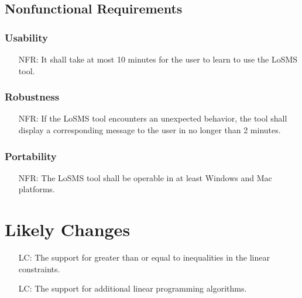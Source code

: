 \documentclass[12pt]{article}
\newcounter{reqnum} %
\newcounter{nfreqnum} %
\newcounter{lcnum} %
\newcommand{\famname}{LoSMS} %
\begin{document}
\subsection{Nonfunctional Requirements}

\subsubsection*{Usability}

\noindent 
\begin{itemize}
	\item[NFR\refstepcounter{nfreqnum}\thenfreqnum \label{usability}:] It shall 
	take at most 10 minutes for the user to learn to use the \famname{} tool.
\end{itemize}

\subsubsection*{Robustness}

\begin{itemize}
	\item[NFR\refstepcounter{nfreqnum}\thenfreqnum \label{robustness}:] If the 
	\famname{} tool encounters an unexpected behavior, the tool shall display 
	a corresponding message to the user in no longer than 2 minutes.
\end{itemize}

\subsubsection*{Portability}

\begin{itemize}
	\item[NFR\refstepcounter{nfreqnum}\thenfreqnum \label{portability}:] The 
	\famname{} tool shall be operable in at least Windows and Mac platforms.
\end{itemize}

\section{Likely Changes} \label{Sec_LikelyChanges} 

\noindent 
\begin{itemize}
	\item[LC\refstepcounter{lcnum}\thelcnum\label{LC_inequalities}:] The 
	support for greater than or equal to inequalities in the linear constraints.
	
	\item[LC\refstepcounter{lcnum}\thelcnum\label{LC_moreAlgorithms}:] The 
	support for additional linear programming algorithms.
\end{itemize}
\end{document}
